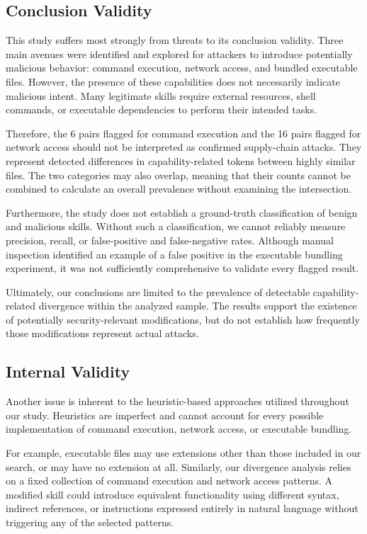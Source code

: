 \documentclass[sigconf,review]{acmart}
\begin{document}
\subsection{Conclusion Validity}

This study suffers most strongly from threats to its conclusion validity. Three main avenues were identified and explored for attackers to introduce potentially malicious behavior: command execution, network access, and bundled executable files. However, the presence of these capabilities does not necessarily indicate malicious intent. Many legitimate skills require external resources, shell commands, or executable dependencies to perform their intended tasks.

Therefore, the 6 pairs flagged for command execution and the 16 pairs flagged for network access should not be interpreted as confirmed supply-chain attacks. They represent detected differences in capability-related tokens between highly similar files. The two categories may also overlap, meaning that their counts cannot be combined to calculate an overall prevalence without examining the intersection.

Furthermore, the study does not establish a ground-truth classification of benign and malicious skills. Without such a classification, we cannot reliably measure precision, recall, or false-positive and false-negative rates. Although manual inspection identified an example of a false positive in the executable bundling experiment, it was not sufficiently comprehensive to validate every flagged result.

Ultimately, our conclusions are limited to the prevalence of detectable capability-related divergence within the analyzed sample. The results support the existence of potentially security-relevant modifications, but do not establish how frequently those modifications represent actual attacks.

\subsection{Internal Validity}

Another issue is inherent to the heuristic-based approaches utilized throughout our study. Heuristics are imperfect and cannot account for every possible implementation of command execution, network access, or executable bundling.

For example, executable files may use extensions other than those included in our search, or may have no extension at all. Similarly, our divergence analysis relies on a fixed collection of command execution and network access patterns. A modified skill could introduce equivalent functionality using different syntax, indirect references, or instructions expressed entirely in natural language without triggering any of the selected patterns.
\end{document}
